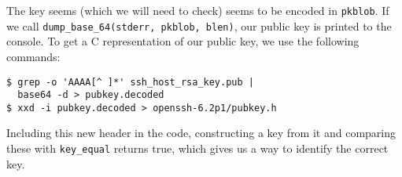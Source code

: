 \documentclass[a4paper,10pt]{article}
\begin{document}
The key seems (which we will need to check) seems to be encoded in \lstinline|pkblob|.
If we call \lstinline|dump_base_64(stderr, pkblob, blen)|, our public key is
printed to the console. To get a C representation of our public key, we use
the following commands:

\begin{verbatim}
$ grep -o 'AAAA[^ ]*' ssh_host_rsa_key.pub |
  base64 -d > pubkey.decoded
$ xxd -i pubkey.decoded > openssh-6.2p1/pubkey.h
\end{verbatim}

Including this new header in the code, constructing a key from it and comparing
these with \lstinline|key_equal| returns true, which gives us a way to identify
the correct key.
\end{document}
